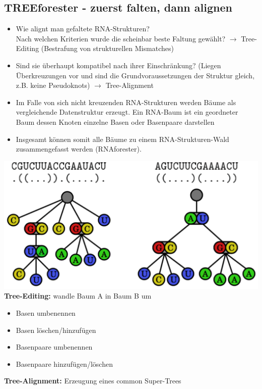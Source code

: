 \subsection{TREEforester - zuerst falten, dann alignen}
\begin{itemize}
\item Wie alignt man gefaltete RNA-Strukturen? \\
Nach welchen Kriterien wurde die scheinbar beste Faltung gewählt? $\rightarrow$ Tree-Editing (Bestrafung von strukturellen Mismatches)
\item Sind sie überhaupt kompatibel nach ihrer Einschränkung? (Liegen Überkreuzungen vor und sind die Grundvoraussetzungen der Struktur gleich, z.B. keine Pseudoknots) $\rightarrow$ Tree-Alignment
\item Im Falle von sich nicht kreuzenden RNA-Strukturen werden Bäume als vergleichende Datenstruktur erzeugt. Ein RNA-Baum ist ein geordneter Baum dessen Knoten einzelne Basen oder Basenpaare darstellen
\item Insgesamt können somit alle Bäume zu einem RNA-Strukturen-Wald zusammengefasst werden (RNAforester). \\
\end{itemize}
\includegraphics[scale=0.5]{lectures/160509/pix/Baeume.pdf} \\

\textbf{Tree-Editing:} wandle Baum A in Baum B um
\begin{itemize}
\item Basen umbenennen
\item Basen löschen/hinzufügen
\item Basenpaare umbenennen
\item Basenpaare hinzufügen/löschen
\end{itemize}

\textbf{Tree-Alignment:} Erzeugung eines common Super-Trees

